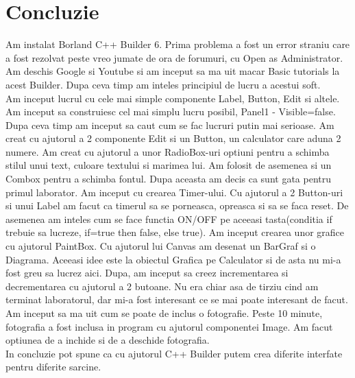 \section*{Concluzie}

Am instalat Borland C++ Builder 6. Prima problema a fost un error straniu care a fost rezolvat peste vreo jumate de ora de forumuri, cu Open as Administrator. Am deschis Google si Youtube si am inceput sa ma uit macar Basic tutorials la acest Builder. Dupa ceva timp am inteles principiul de lucru a acestui soft.\\
Am inceput lucrul cu cele mai simple componente Label, Button, Edit si altele. Am inceput sa construiesc cel mai simplu lucru posibil, Panel1 - Visible=false. Dupa ceva timp am inceput sa caut cum se fac lucruri putin mai serioase. Am creat cu ajutorul a 2 componente Edit si un Button, un calculator care aduna 2 numere. Am creat cu ajutorul a unor RadioBox-uri optiuni pentru a schimba stilul unui text, culoare textului si marimea lui. Am folosit de asemenea si un Combox pentru a schimba fontul. Dupa aceasta am decis ca sunt gata pentru primul laborator. Am inceput cu crearea Timer-ului. Cu ajutorul a 2 Button-uri si unui Label am facut ca timerul sa se porneasca, opreasca si sa se faca reset. De asemenea am inteles cum se face functia ON/OFF pe aceeasi tasta(conditia if trebuie sa lucreze, if=true then false, else true). Am inceput crearea unor grafice cu ajutorul PaintBox. Cu ajutorul lui Canvas am desenat un BarGraf si o Diagrama. Aceeasi idee este la obiectul Grafica pe Calculator si de asta nu mi-a fost greu sa lucrez aici. Dupa, am inceput sa creez incrementarea si decrementarea cu ajutorul a 2 butoane. Nu era chiar asa de tirziu cind am terminat laboratorul, dar mi-a fost interesant ce se mai poate interesant de facut. Am inceput sa ma uit cum se poate de inclus o fotografie. Peste 10 minute, fotografia a fost inclusa in program cu ajutorul componentei Image. Am facut optiunea de a inchide si de a deschide fotografia.\\
In concluzie pot spune ca cu ajutorul C++ Builder putem crea diferite interfate pentru diferite sarcine.

\clearpage